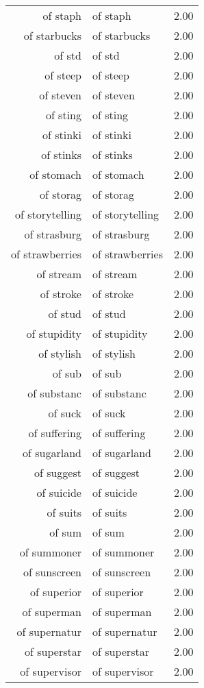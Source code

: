 \begin{table}[ht]
\begin{tabular}{rlr}
  of staph & of staph & 2.00 \\ 
  of starbucks & of starbucks & 2.00 \\ 
  of std & of std & 2.00 \\ 
  of steep & of steep & 2.00 \\ 
  of steven & of steven & 2.00 \\ 
  of sting & of sting & 2.00 \\ 
  of stinki & of stinki & 2.00 \\ 
  of stinks & of stinks & 2.00 \\ 
  of stomach & of stomach & 2.00 \\ 
  of storag & of storag & 2.00 \\ 
  of storytelling & of storytelling & 2.00 \\ 
  of strasburg & of strasburg & 2.00 \\ 
  of strawberries & of strawberries & 2.00 \\ 
  of stream & of stream & 2.00 \\ 
  of stroke & of stroke & 2.00 \\ 
  of stud & of stud & 2.00 \\ 
  of stupidity & of stupidity & 2.00 \\ 
  of stylish & of stylish & 2.00 \\ 
  of sub & of sub & 2.00 \\ 
  of substanc & of substanc & 2.00 \\ 
  of suck & of suck & 2.00 \\ 
  of suffering & of suffering & 2.00 \\ 
  of sugarland & of sugarland & 2.00 \\ 
  of suggest & of suggest & 2.00 \\ 
  of suicide & of suicide & 2.00 \\ 
  of suits & of suits & 2.00 \\ 
  of sum & of sum & 2.00 \\ 
  of summoner & of summoner & 2.00 \\ 
  of sunscreen & of sunscreen & 2.00 \\ 
  of superior & of superior & 2.00 \\ 
  of superman & of superman & 2.00 \\ 
  of supernatur & of supernatur & 2.00 \\ 
  of superstar & of superstar & 2.00 \\ 
  of supervisor & of supervisor & 2.00 \\ 

\end{tabular}
\end{table}
